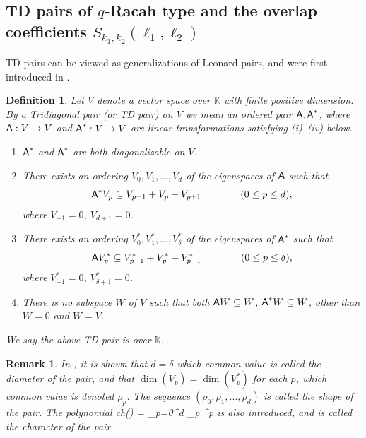 \documentclass[11pt]{amsart}
\numberwithin{equation}{section}
\newtheorem{defn}[thm]{Definition}
\newtheorem{rem}[thm]{Remark}
\numberwithin{equation}{section}
\begin{document}
\subsection{TD pairs of $q$-Racah type and the overlap coefficients $S_{k_1,k_2}(\ell_1,\ell_2)$ \label{ssec:S}} 
TD pairs can be viewed as generalizations of Leonard pairs, and were first introduced in \cite{ITT99}. 
\begin{defn} \cite{ITT99}
\label{def:tdrecall}
Let $V$ denote
a vector space over ${\mathbb K}$ with finite positive dimension.
By a {\it Tridiagonal pair} (or {\it TD pair}) on $V$
we mean an ordered pair ${\textsf A}, {\textsf A}^*$, where
${\textsf A}:V\rightarrow V$ and ${\textsf A}^*:V\rightarrow V$ are linear transformations 
satisfying (i)--(iv) below.
\begin{enumerate}[label=(\roman*)]
\item ${\textsf A}^*$ and ${\textsf A}^*$ are both diagonalizable on $V$.
\item There exists an ordering $V_0, V_1,\ldots, V_d$ of the  
eigenspaces of ${\textsf A}$ such that 
\begin{equation}
{\textsf A}^* V_p \subseteq V_{p-1} + V_p+ V_{p+1} \qquad \qquad (0 \leq p \leq d),
\label{eq:tdrecall1}\nonumber
\end{equation}
where $V_{-1} = 0$, $V_{d+1}= 0$.
\item There exists an ordering $V^*_0, V^*_1,\ldots, V^*_\delta$ of
the  
eigenspaces of ${\textsf A}^*$ such that 
\begin{equation}
{\textsf A} V^*_p \subseteq V^*_{p-1} + V^*_p+ V^*_{p+1} \qquad \qquad (0 \leq p \leq \delta),
\label{eq:tdrecall2}\nonumber
\end{equation}
where $V^*_{-1} = 0$, $V^*_{\delta+1}= 0$.
\item There is no subspace $W$ of $V$ such  that  both ${\textsf A}W\subseteq W$,
${\textsf A}^*W\subseteq W$, other than $W=0$ and $W=V$.
\end{enumerate}
We say the above TD pair is over ${\mathbb K}$.
\end{defn}
\begin{rem}\label{rem:diam}
In \cite{ITT99}, it is shown that $d=\delta$ which common value is called the diameter of the pair, and that $\dim(V_p)=\dim(V_p^*)$ for each $p$, which common value is denoted $\rho_p$. The sequence  $(\rho_0,\rho_1,...,\rho_d)$ is called the shape of the pair. The polynomial
\beqa
ch(\lambda) = \sum_{p=0}^{d} \rho_p \lambda^p  \label{eq:char}
\eeqa
is also introduced, and is called the character of the pair.
\end{rem} 
\end{document}
